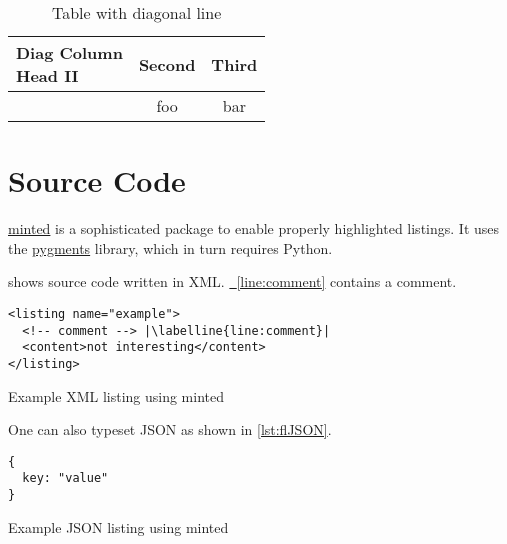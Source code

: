 \documentclass[
  fontsize=10pt,
  numbers=noenddot,
  english,  %
  paper=a5,
  twoside,  %
  DIV=calc,
  headings=small,
  bibliography=totoc,
  listof=totoc,
  draft=false
]{scrbook}
\theoremstyle{break}
\newcommand{\labelline}[1]{\label[line]{#1}\hypertarget{#1}{}}
\newcommand{\refline}[1]{\hyperlink{#1}{\FancyVerbLineautorefname~\ref*{#1}}}
\begin{document}
\begin{ltgexample}
\begin{table}
  \caption{Table with diagonal line}
  \label{tab:diag}
  \begin{center}
    \begin{tabular}{|l|c|c|}
      \hline
      \diagbox[width=10em]{Diag \\Column Head I}{Diag Column\\Head II} & Second & Third \\
      \hline
       & foo & bar              \\
      \hline
    \end{tabular}
  \end{center}
\end{table}
\end{ltgexample}


\section{Source Code}

\href{https://github.com/gpoore/minted}{minted} is a sophisticated package to enable properly highlighted listings.
It uses the \href{http://pygments.org/}{pygments} library, which in turn requires Python.

\begin{ltgexample}
 shows source code written in XML.
\refline{line:comment} contains a comment.

\begin{listing}[htbp]
  \begin{verbatim}
<listing name="example">
  <!-- comment --> |\labelline{line:comment}|
  <content>not interesting</content>
</listing>
\end{verbatim}
  \caption{Example XML listing using minted}
  \label{lst:XML}
\end{listing}
\end{ltgexample}

One can also typeset JSON as shown in \cref{lst:flJSON}.

\begin{ltgexample}
\begin{listing}[htbp]
  \begin{verbatim}
{
  key: "value"
}
\end{verbatim}
  \caption{Example JSON listing using minted}
  \label{lst:flJSON}
\end{listing}
\end{ltgexample}
\end{document}
